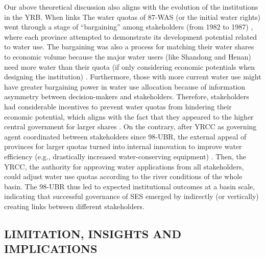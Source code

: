 Our above theoretical discussion also aligns with the evolution of the institutions in the YRB.
When links The water quotas of 87-WAS (or the initial water rights) went through a stage of ``bargaining'' among stakeholders (from 1982 to 1987) \cite{wang2019a, wang2019d}, where each province attempted to demonstrate its development potential related to water use.
The bargaining was also a process for matching their water shares to economic volume because the major water users (like Shandong and Henan) need more water than their quota (if only considering economic potentials when designing the institution) \cite{zuo2020}.
Furthermore, those with more current water use might have greater bargaining power in water use allocation because of information asymmetry between decision-makers and stakeholders.
Therefore, stakeholders had considerable incentives to prevent water quotas from hindering their economic potential, which aligns with the fact that they appeared to the higher central government for larger shares \cite{wang2019a, wang2019d}.
On the contrary, after YRCC as governing agent coordinated between stakeholders since 98-UBR, the external appeal of provinces for larger quotas turned into internal innovation to improve water efficiency (e.g., drastically increased water-conserving equipment)
\cite{krieger1955, ostrom1990}.
Then, the YRCC, the authority for approving water applications from all stakeholders, could adjust water use quotas according to the river conditions of the whole basin.
The 98-UBR thus led to expected institutional outcomes at a basin scale, indicating that successful governance of SES emerged by indirectly (or vertically) creating links between different stakeholders.

\subsection{LIMITATION, INSIGHTS AND IMPLICATIONS}
\label{discussion-3}

